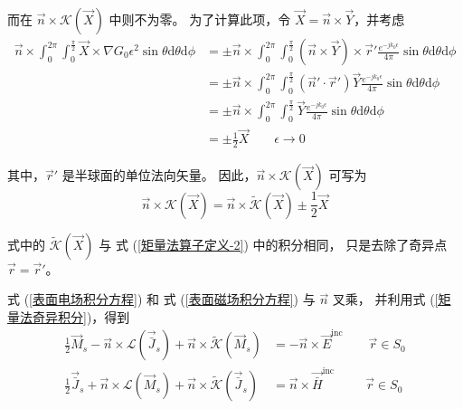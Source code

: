 而在 $\vec{n}\times \mathcal{K}(\vec{X})$ 中则不为零。
为了计算此项，令
$\vec{X}=\vec{n}\times \vec{Y}$，并考虑
\begin{equation}
    \begin{aligned}
        \vec{n}\times \int_{0}^{2\pi}
        \int_{0}^{\frac{\pi}{2}}
        \vec{X}\times\nabla G_0 \epsilon^2 \sin\theta \text{d}\theta\text{d}\phi
        &=
        \pm \vec{n}\times \int_{0}^{2\pi}
        \int_{0}^{\frac{\pi}{2}}
        (\vec{n}\times\vec{Y})\times \vec{r}' 
        \frac{e^{-jk_0\epsilon}}{4\pi}
        \sin \theta \text{d}\theta\text{d}\phi\\
        &=
        \pm \vec{n}\times \int_{0}^{2\pi}
        \int_{0}^{\frac{\pi}{2}}
        (\vec{n}'\cdot\vec{r}')\vec{Y} \frac{e^{-jk_0\epsilon}}{4\pi}
        \sin \theta \text{d}\theta\text{d}\phi\\
        &=
        \pm \vec{n}\times 
        \int_{0}^{2\pi} \int_{0}^{\frac{\pi}{2}}
        \vec{Y} \frac{e^{-jk_0\epsilon}}{4\pi}
        \sin \theta \text{d}\theta\text{d}\phi\\
        &=\pm \frac{1}{2} \vec{X}
        \qquad
        \epsilon\rightarrow 0
    \end{aligned}
\end{equation}
\par 其中，$\vec{r}'$ 是半球面的单位法向矢量。
因此，$\vec{n}\times\mathcal{K}(\vec{X})$ 可写为
\begin{equation}
    \vec{n}\times \mathcal{K}(\vec{X})
    =\vec{n}\times \tilde{\mathcal{K}}(\vec{X})
    \pm \frac{1}{2}\vec{X}
    \label{矩量法奇异积分}
\end{equation}
\par 式中的 $\tilde{\mathcal{K}}(\vec{X})$ 与
式 (\ref{矩量法算子定义-2}) 中的积分相同，
只是去除了奇异点 $\vec{r}=\vec{r}'$。
\par 式 (\ref{表面电场积分方程}) 和
式 (\ref{表面磁场积分方程}) 与 $\vec{n}$ 叉乘，
并利用式 (\ref{矩量法奇异积分})，得到
\begin{align}
    \frac{1}{2}\vec{M}_s
    -\vec{n}\times\mathcal{L}(\vec{\bar{J}}_s)
    +\vec{n}\times\tilde{\mathcal{K}}(\vec{M}_s)
    &=-\vec{n}\times\vec{E}^{\text{inc}}
    \qquad
    \vec{r}\in S_0\\
    \frac{1}{2}\vec{\bar{J}}_s
    +\vec{n}\times\mathcal{L}(\vec{M}_s)
    +\vec{n}\times\tilde{\mathcal{K}}(\vec{\bar{J}}_s)
    &=\vec{n}\times\vec{\bar{H}}^{\text{inc}}
    \qquad \ \ 
    \vec{r}\in S_0
\end{align}

